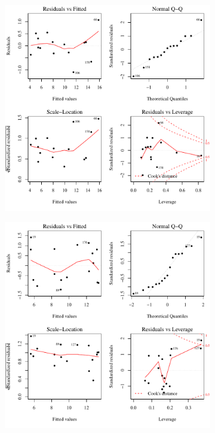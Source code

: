 \begin{linenumbers}
\subfiguretop
\begin{landscape}
	\begin{figure}
		\begin{subfigure}{0.7\textwidth}
			\centering
			\includegraphics[width=\tableCustomSize]{"Figures/Results_USR/Stochastic/Conc Model lm-fit U163"}
		\end{subfigure}%
		\begin{subfigure}{0.7\textwidth}
			\centering
			\includegraphics[width=\tableCustomSize]{"Figures/Results_USR/Stochastic/Conc Model lm-fit U201"}

\end{subfigure}
\end{figure}
\end{landscape}
\end{linenumbers}
